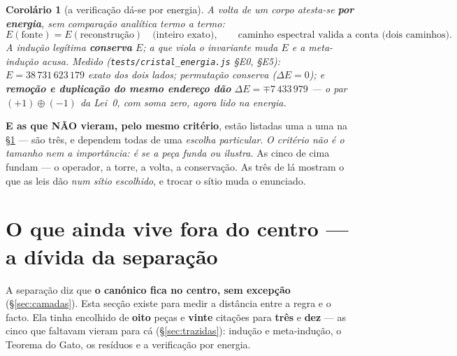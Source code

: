 \documentclass[11pt,a4paper]{article}
\newtheorem{corolario}[teorema]{Corolário}
\newcommand{\code}[1]{\texttt{\small #1}}
\begin{document}
\begin{corolario}[a verificação dá-se por energia]\label{cor:verifica-energia}
A volta de um corpo atesta-se \textbf{por energia}, sem comparação
analítica termo a termo:
\[
\boxed{
E(\text{fonte})=E(\text{reconstrução})
\quad\text{(inteiro exato)},
}
\qquad
\boxed{
\text{caminho espectral valida a conta (dois caminhos)}.
}
\]
A indução legítima \textbf{conserva} $E$; a que viola o invariante muda
$E$ e a meta-indução acusa. Medido
(\code{tests/cristal\_energia.js} \S E0, \S E5):
$E=38\,731\,623\,179$ exato dos dois lados; permutação conserva
($\Delta E=0$); e \textbf{remoção e duplicação do mesmo endereço dão}
$\Delta E=\mp7\,433\,979$ --- o par $(+1)\oplus(-1)$ da Lei~0, com soma
zero, agora lido na energia.
\end{corolario}


\medskip
\noindent\textbf{E as que NÃO vieram, pelo mesmo critério}, estão listadas uma a uma na
\S\ref{sec:dividas} --- são três, e dependem todas de uma \emph{escolha particular}.
\emph{O critério não é o tamanho nem a importância: é se a peça funda ou ilustra.} As cinco
de cima fundam --- o operador, a torre, a volta, a conservação. As três de lá mostram o que
as leis dão \emph{num sítio escolhido}, e trocar o sítio muda o enunciado.

\section{O que ainda vive fora do centro --- a dívida da separação}\label{sec:dividas}

A separação diz que \textbf{o canónico fica no centro, sem excepção} (\S\ref{sec:camadas}).
Esta secção existe para medir a distância entre a regra e o facto. Ela tinha encolhido de
\textbf{oito} peças e \textbf{vinte} citações para \textbf{três} e \textbf{dez} --- as cinco
que faltavam vieram para cá (\S\ref{sec:trazidas}): indução e meta-indução, o Teorema do
Gato, os resíduos e a verificação por energia.
\end{document}
